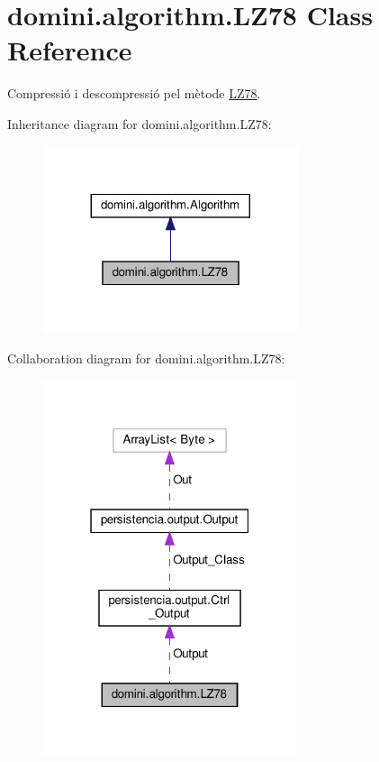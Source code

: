\hypertarget{classdomini_1_1algorithm_1_1LZ78}{}\section{domini.\+algorithm.\+L\+Z78 Class Reference}
\label{classdomini_1_1algorithm_1_1LZ78}


Compressió i descompressió pel mètode \hyperlink{classdomini_1_1algorithm_1_1LZ78}{L\+Z78}.  




Inheritance diagram for domini.\+algorithm.\+L\+Z78\+:
\nopagebreak
\begin{figure}[H]
\begin{center}
\leavevmode
\includegraphics[width=212pt]{classdomini_1_1algorithm_1_1LZ78__inherit__graph}
\end{center}
\end{figure}


Collaboration diagram for domini.\+algorithm.\+L\+Z78\+:\nopagebreak
\begin{figure}[H]
\begin{center}
\leavevmode
\includegraphics[width=211pt]{classdomini_1_1algorithm_1_1LZ78__coll__graph}
\end{center}
\end{figure}

